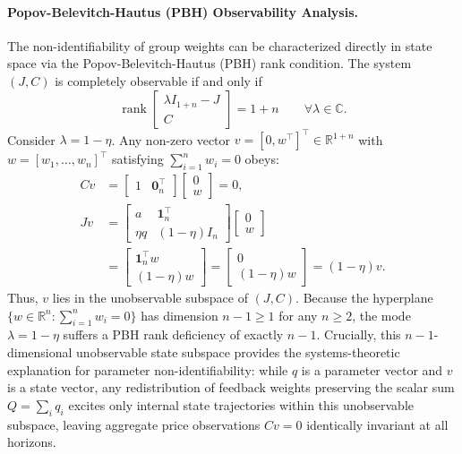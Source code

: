 \documentclass[10pt,twocolumn,letterpaper]{article}
\theoremstyle{definition}
\theoremstyle{remark}
\begin{document}
\paragraph{Popov-Belevitch-Hautus (PBH) Observability Analysis.}
The non-identifiability of group weights can be characterized directly in state space via the Popov-Belevitch-Hautus (PBH) rank condition. The system $(J, C)$ is completely observable if and only if
\begin{equation}
 \operatorname{rank}\begin{bmatrix} \lambda I_{1+n} - J \\ C \end{bmatrix} = 1 + n \qquad \forall \lambda \in \mathbb{C}.
\end{equation}
Consider $\lambda = 1 - \eta$. Any non-zero vector $v = [0, w^\top]^\top \in \mathbb{R}^{1+n}$ with $w = [w_1, \dots, w_n]^\top$ satisfying $\sum_{i=1}^n w_i = 0$ obeys:
\begin{align}
 C v &= \begin{bmatrix} 1 & \mathbf{0}_n^\top \end{bmatrix} \begin{bmatrix} 0 \\ w \end{bmatrix} = 0, \\
 J v &= \begin{bmatrix} a & \mathbf{1}_n^\top \\ \eta q & (1-\eta)I_n \end{bmatrix} \begin{bmatrix} 0 \\ w \end{bmatrix} \nonumber\\
 &= \begin{bmatrix} \mathbf{1}_n^\top w \\ (1-\eta)w \end{bmatrix} = \begin{bmatrix} 0 \\ (1-\eta)w \end{bmatrix} = (1-\eta) v.
\end{align}
Thus, $v$ lies in the unobservable subspace of $(J, C)$. Because the hyperplane $\{w \in \mathbb{R}^n : \sum_{i=1}^n w_i = 0\}$ has dimension $n - 1 \ge 1$ for any $n \ge 2$, the mode $\lambda = 1 - \eta$ suffers a PBH rank deficiency of exactly $n - 1$. Crucially, this $n-1$-dimensional unobservable state subspace provides the systems-theoretic explanation for parameter non-identifiability: while $q$ is a parameter vector and $v$ is a state vector, any redistribution of feedback weights preserving the scalar sum $Q = \sum_i q_i$ excites only internal state trajectories within this unobservable subspace, leaving aggregate price observations $Cv=0$ identically invariant at all horizons.
\end{document}
